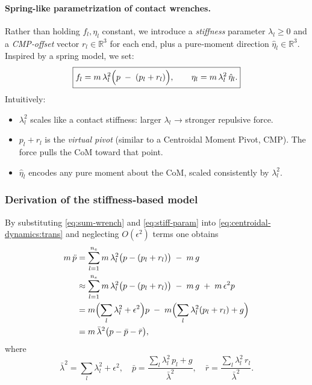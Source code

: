 \documentclass[main.tex]{subfiles}
\begin{document}
\paragraph{Spring-like parametrization of contact wrenches.}
Rather than holding $f_l,\eta_l$ constant, we introduce a \emph{stiffness} parameter $\lambda_l\ge0$ and a \emph{CMP‐offset} vector $r_l\in\mathbb{R}^3$ for each end, plus a pure‐moment direction $\hat\eta_l\in\mathbb{R}^3$.  Inspired by a spring model, we set:
\begin{equation}\label{eq:stiff‐param}
\boxed{
\displaystyle
f_l = m\,\lambda_l^2\Bigl(p \;-\;(p_l + r_l)\Bigr),
\qquad
\eta_l = m\,\lambda_l^2\,\hat\eta_l.
}
\end{equation}
Intuitively:
\begin{itemize}
  \item $\lambda_l^2$ scales like a contact stiffness: larger $\lambda_l$ → stronger repulsive force.
  \item $p_l + r_l$ is the \emph{virtual pivot} (similar to a Centroidal Moment Pivot, CMP).  The force pulls the CoM toward that point.
  \item $\hat\eta_l$ encodes any pure moment about the CoM, scaled consistently by $\lambda_l^2$.
\end{itemize}

\subsubsection*{Derivation of the stiffness‐based model}
By substituting \eqref{eq:sum‐wrench} and \eqref{eq:stiff‐param} into \eqref{eq:centroidal‐dynamics:trans} and neglecting $O(\epsilon^2)$ terms one obtains
\begin{align}
m\,\ddot p
&= \sum_{l=1}^{n_e} m\,\lambda_l^2\bigl(p - (p_l + r_l)\bigr) \;-\; m\,g
\notag\\
&\approx \sum_{l=1}^{n_e} m\,\lambda_l^2\bigl(p - (p_l + r_l)\bigr) \;-\; m\,g \;+\; m\,\epsilon^2 p
\notag\\
&= m\Bigl(\sum_{l}\lambda_l^2 + \epsilon^2\Bigr)p \;-\; m\Bigl(\sum_{l}\lambda_l^2(p_l + r_l) + g\Bigr)
\notag\\
&= m\,\bar\lambda^2\bigl(p - \bar p - \bar r\bigr),
\label{eq:deriv‐trans}
\end{align}
where
\[
\bar\lambda^2 = \sum_{l}\lambda_l^2 + \epsilon^2,
\quad
\bar p = \frac{\sum_{l}\lambda_l^2\,p_l + g}{\bar\lambda^2},
\quad
\bar r = \frac{\sum_{l}\lambda_l^2\,r_l}{\bar\lambda^2}.
\]
\end{document}
